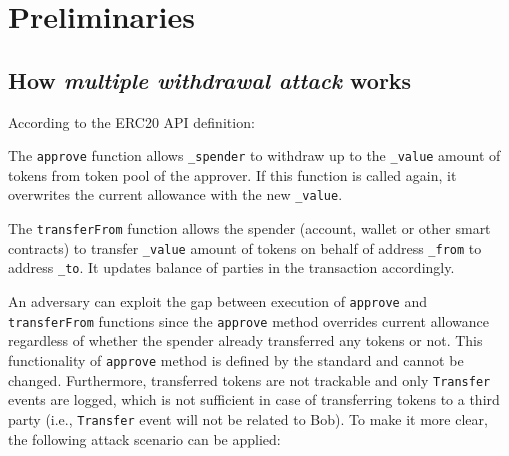 
\section{Preliminaries}

\subsection{How \textit{multiple withdrawal attack} works}

\noindent According to the ERC20 API definition:

\begin{compactlist}
\item The \texttt{approve} function allows \texttt{\_spender} to withdraw up to the \texttt{\_value} amount of tokens from token pool of the approver. If this function is called again, it overwrites the current allowance with the new \texttt{\_value}.
\item The \texttt{transferFrom} function allows the spender (\eg account, wallet or other smart contracts) to transfer \texttt{\_value} amount of tokens on behalf of address \texttt{\_from} to address \texttt{\_to}. It updates balance of parties in the transaction accordingly. 
\end{compactlist}
An adversary can exploit the gap between execution of \texttt{approve} and \texttt{transferFrom} functions since the \texttt{approve} method overrides current allowance regardless of whether the spender already transferred any tokens or not. This functionality of \texttt{approve} method is defined by the standard and cannot be changed. Furthermore, transferred tokens are not trackable and only \texttt{Transfer} events are logged, which is not sufficient in case of transferring tokens to a third party (i.e., \texttt{Transfer} event will not be related to Bob). To make it more clear, the following attack scenario can be applied:

